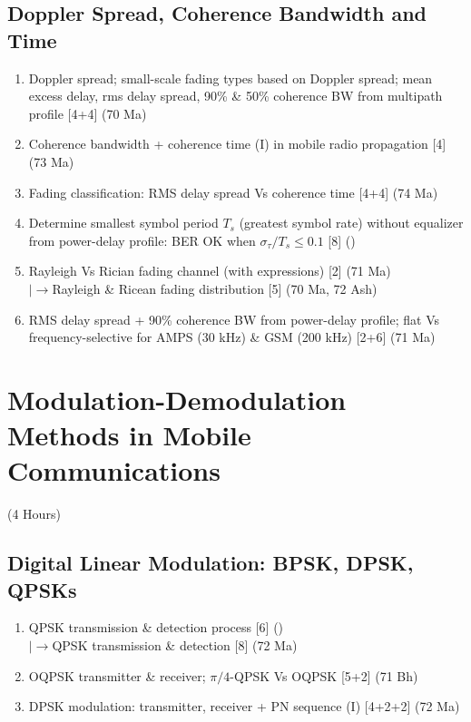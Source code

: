 \documentclass[12pt]{article}
\newcommand{\lb}{\\$\left|\rightarrow\right.$}
\begin{document}
  \subsection{Doppler Spread, Coherence Bandwidth and Time}
    \begin{enumerate}[topsep=0pt, noitemsep]
      \item Doppler spread; small-scale fading types based on Doppler spread;
        mean excess delay, rms delay spread, 90\% \& 50\% coherence BW
        from multipath profile \hfill [4+4] (70 Ma)
      \item Coherence bandwidth + coherence time (I) in mobile radio propagation \hfill [4] (73 Ma)
      \item Fading classification: RMS delay spread Vs coherence time \hfill [4+4] (74 Ma)
      \item Determine smallest symbol period $T_s$ (greatest symbol rate) without equalizer
        from power-delay profile: BER OK when $\sigma_\tau/T_s \le 0.1$ \hfill [8] ()
      \item Rayleigh Vs Rician fading channel (with expressions) \hfill [2] (71 Ma)
        \lb Rayleigh \& Ricean fading distribution \hfill [5] (70 Ma, 72 Ash)
      \item RMS delay spread + 90\% coherence BW from power-delay profile;
        flat Vs frequency-selective for AMPS (30 kHz) \& GSM (200 kHz) \hfill [2+6] (71 Ma)
    \end{enumerate}

\pagebreak
\section{Modulation-Demodulation Methods in Mobile Communications}
\begin{center}(4 Hours)\end{center}

  \subsection{Digital Linear Modulation: BPSK, DPSK, QPSKs}
    \begin{enumerate}[topsep=0pt, noitemsep]
      \item QPSK transmission \& detection process \hfill [6] ()
        \lb QPSK transmission \& detection \hfill [8] (72 Ma)
      \item OQPSK transmitter \& receiver; $\pi/4$-QPSK Vs OQPSK \hfill [5+2] (71 Bh)
      \item DPSK modulation: transmitter, receiver + PN sequence (I) \hfill [4+2+2] (72 Ma)
    \end{enumerate}
\end{document}

